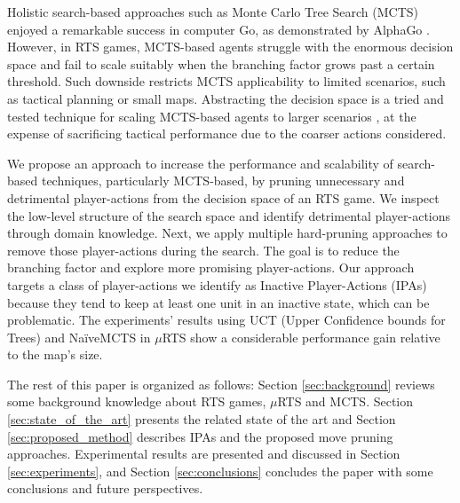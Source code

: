 \documentclass[conference]{IEEEtran}
\newcommand{\mRTS}{$\mu$RTS}
\begin{document}
Holistic search-based approaches such as Monte Carlo Tree Search (MCTS) \cite{browne_survey_2012} enjoyed a remarkable success in computer Go, as demonstrated by AlphaGo \cite{silver_mastering_2016}.
 However, in RTS games, MCTS-based agents struggle with the enormous decision space and fail to scale suitably when the branching factor grows past a certain threshold. Such downside restricts MCTS applicability to limited scenarios, such as tactical planning or small maps. Abstracting the decision space is a tried and tested technique for scaling MCTS-based agents to larger scenarios \cite{ontanon_survey_2013}, 
at the expense of sacrificing tactical performance due to the coarser actions considered.

We propose an approach to increase the performance and scalability of search-based techniques, particularly MCTS-based, by pruning unnecessary and detrimental player-actions from the decision space of an RTS game. 
We inspect the low-level structure of the search space and identify detrimental player-actions through domain knowledge. Next, we apply multiple hard-pruning approaches to remove those player-actions during the search. The goal is to reduce the branching factor and explore more promising player-actions. Our approach targets a class of player-actions we identify as Inactive Player-Actions (IPAs) because they tend to keep at least one unit in an inactive state, which can be problematic. The experiments' results using UCT (Upper Confidence bounds for Trees) and NaïveMCTS in \mRTS{} show a considerable performance gain relative to the map's size.

 

The rest of this paper is organized as follows: Section \ref{sec:background} reviews some background knowledge about RTS games, \mRTS{} and MCTS. Section \ref{sec:state_of_the_art} presents the related state of the art and Section \ref{sec:proposed_method} describes IPAs and the proposed move pruning approaches. Experimental results are presented and discussed in Section \ref{sec:experiments}, and Section \ref{sec:conclusions} concludes the paper with some conclusions and future perspectives.
\end{document}
